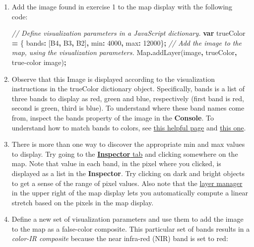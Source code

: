 \documentclass[
]{article}
\newenvironment{Shaded}{\begin{snugshade}}{\end{snugshade}}
\newcommand{\BuiltInTok}[1]{#1}
\newcommand{\CommentTok}[1]{\textcolor[rgb]{0.56,0.35,0.01}{\textit{#1}}}
\newcommand{\DataTypeTok}[1]{\textcolor[rgb]{0.13,0.29,0.53}{#1}}
\newcommand{\DecValTok}[1]{\textcolor[rgb]{0.00,0.00,0.81}{#1}}
\newcommand{\FunctionTok}[1]{\textcolor[rgb]{0.00,0.00,0.00}{#1}}
\newcommand{\KeywordTok}[1]{\textcolor[rgb]{0.13,0.29,0.53}{\textbf{#1}}}
\newcommand{\NormalTok}[1]{#1}
\newcommand{\OperatorTok}[1]{\textcolor[rgb]{0.81,0.36,0.00}{\textbf{#1}}}
\newcommand{\StringTok}[1]{\textcolor[rgb]{0.31,0.60,0.02}{#1}}
\begin{document}
\begin{enumerate}
\def\labelenumi{\alph{enumi}.}
\item
  Add the image found in exercise 1 to the map display with the following code:

\begin{Shaded}
\begin{Highlighting}[]
\CommentTok{//  Define visualization parameters in a JavaScript dictionary.   }
\KeywordTok{var}\NormalTok{ trueColor }\OperatorTok{=}\NormalTok{ \{    }
  \DataTypeTok{bands}\OperatorTok{:}\NormalTok{ [}\StringTok{\textquotesingle{}B4\textquotesingle{}}\OperatorTok{,} \StringTok{\textquotesingle{}B3\textquotesingle{}}\OperatorTok{,} \StringTok{\textquotesingle{}B2\textquotesingle{}}\NormalTok{]}\OperatorTok{,}    
  \DataTypeTok{min}\OperatorTok{:} \DecValTok{4000}\OperatorTok{,}    
  \DataTypeTok{max}\OperatorTok{:} \DecValTok{12000}\NormalTok{\}}\OperatorTok{;}  
\CommentTok{// Add the image to the  map, using the visualization parameters.   }
\BuiltInTok{Map}\OperatorTok{.}\FunctionTok{addLayer}\NormalTok{(image}\OperatorTok{,}\NormalTok{ trueColor}\OperatorTok{,} \StringTok{\textquotesingle{}true{-}color image\textquotesingle{}}\NormalTok{)}\OperatorTok{;}  
\end{Highlighting}
\end{Shaded}
\item
  Observe that this Image is displayed according to the visualization instructions in the trueColor dictionary object. Specifically, bands is a list of three bands to display as red, green and blue, respectively (first band is red, second is green, third is blue). To understand where these band names come from, inspect the bands property of the image in the \textbf{Console}. To understand how to match bands to colors, see \href{http://landsat.usgs.gov/band_designations_landsat_satellites.php}{this helpful page} and \href{http://landsat.usgs.gov/L8_band_combos.php}{this one}.
\item
  There is more than one way to discover the appropriate min and max values to display. Try going to the \href{https://developers.google.com/earth-engine/playground\#inspector-tab}{\textbf{Inspector} tab} and clicking somewhere on the map. Note that value in each band, in the pixel where you clicked, is displayed as a list in the \textbf{Inspector}. Try clicking on dark and bright objects to get a sense of the range of pixel values. Also note that the \href{https://developers.google.com/earth-engine/playground\#layer-manager}{layer manager} in the upper right of the map display lets you automatically compute a linear stretch based on the pixels in the map display.
\item
  Define a new set of visualization parameters and use them to add the image to the map as a false-color composite. This particular set of bands results in a \emph{color-IR composite} because the near infra-red (NIR) band is set to red:


\end{enumerate}
\end{document}
